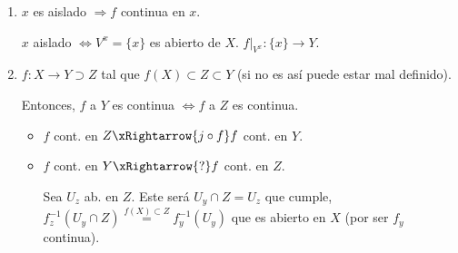 \begin{obs}
\begin{enumerate}
    \item $x$ es aislado $\Rightarrow f$ continua en $x$. 
    \begin{demo}
        $x$ aislado $\Leftrightarrow V^x = \{x\}$ es abierto de $X$. $f|_{V^x} : \{x\} \rightarrow Y$.
    \end{demo}

    \item $f: X \rightarrow Y \supset Z$ tal que $f\left( X \right) \subset Z \subset Y$ (si no es así puede estar mal definido).

    Entonces, $f$ a $Y$ es continua $\Leftrightarrow f$ a $Z$ es continua.
    \begin{demo}
        \begin{itemize}
            \item $f$ cont. en $Z \xRightarrow{j \circ f} f$ cont. en $Y$.
            \item $f$ cont. en $Y \xRightarrow{?} f$ cont. en $Z$. 

            Sea $U_z$ ab. en $Z$. Este será $U_y \cap Z = U_z$ que cumple, $f_z^{-1}\left( U_y \cap Z \right) \stackrel{f\left( X \right) \subset Z}{=}  f_y^{-1}\left( U_y \right)$ que es abierto en $X$ (por ser $f_y$ continua).
        \end{itemize}
    \end{demo}
\end{enumerate}
\end{obs}


